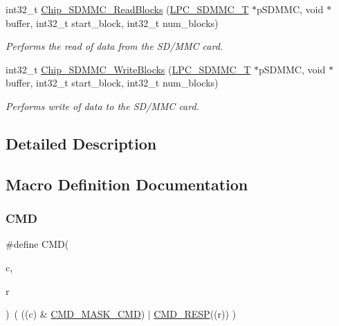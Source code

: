 \begin{DoxyCompactItemize}
int32\+\_\+t \hyperlink{group___s_d_m_m_c__18_x_x__43_x_x_ga9edeed44956f79b1078f566928c06d15}{Chip\+\_\+\+S\+D\+M\+M\+C\+\_\+\+Read\+Blocks} (\hyperlink{struct_l_p_c___s_d_m_m_c___t}{L\+P\+C\+\_\+\+S\+D\+M\+M\+C\+\_\+T} $\ast$p\+S\+D\+M\+MC, void $\ast$buffer, int32\+\_\+t start\+\_\+block, int32\+\_\+t num\+\_\+blocks)
\begin{DoxyCompactList}\small\item\em Performs the read of data from the S\+D/\+M\+MC card. \end{DoxyCompactList}\item 
int32\+\_\+t \hyperlink{group___s_d_m_m_c__18_x_x__43_x_x_ga5d3b431fec6b4c335a7aa9bc0febfcc1}{Chip\+\_\+\+S\+D\+M\+M\+C\+\_\+\+Write\+Blocks} (\hyperlink{struct_l_p_c___s_d_m_m_c___t}{L\+P\+C\+\_\+\+S\+D\+M\+M\+C\+\_\+T} $\ast$p\+S\+D\+M\+MC, void $\ast$buffer, int32\+\_\+t start\+\_\+block, int32\+\_\+t num\+\_\+blocks)
\begin{DoxyCompactList}\small\item\em Performs write of data to the S\+D/\+M\+MC card. \end{DoxyCompactList}\end{DoxyCompactItemize}


\subsection{Detailed Description}


\subsection{Macro Definition Documentation}
\mbox{\label{group___s_d_m_m_c__18_x_x__43_x_x_ga7caafa608408eea45aca375d0d5eb211}} 
\subsubsection{\texorpdfstring{C\+MD}{CMD}}
{\footnotesize\ttfamily \#define C\+MD(\begin{DoxyParamCaption}\item[{}]{c,  }\item[{}]{r }\end{DoxyParamCaption})~( ((c) \&  \hyperlink{group___s_d_m_m_c__18_x_x__43_x_x_ga4deae38df91e0463b20ecea8837c364d}{C\+M\+D\+\_\+\+M\+A\+S\+K\+\_\+\+C\+MD}) $\vert$ \hyperlink{group___s_d_m_m_c__18_x_x__43_x_x_ga91c1b8c0d47030e80d4ff6259b169175}{C\+M\+D\+\_\+\+R\+E\+SP}((r)) )}



